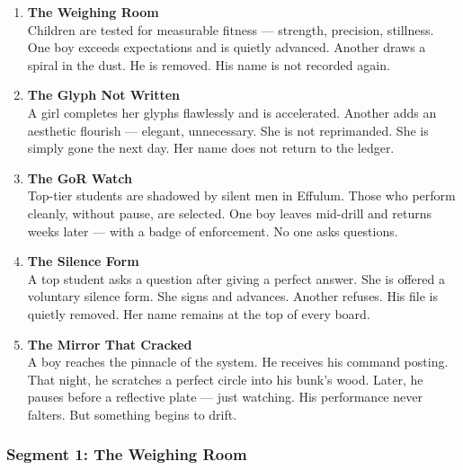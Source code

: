 \documentclass[9pt]{article}
\begin{document}
\begin{center}
\begin{enumerate}
    \item \textbf{The Weighing Room} \\
    Children are tested for measurable fitness — strength, precision, stillness. One boy exceeds expectations and is quietly advanced. Another draws a spiral in the dust. He is removed. His name is not recorded again.

    \vspace{.3in}
    \item \textbf{The Glyph Not Written} \\
    A girl completes her glyphs flawlessly and is accelerated. Another adds an aesthetic flourish — elegant, unnecessary. She is not reprimanded. She is simply gone the next day. Her name does not return to the ledger.

    \vspace{.3in}
    \item \textbf{The GoR Watch} \\
    Top-tier students are shadowed by silent men in Effulum. Those who perform cleanly, without pause, are selected. One boy leaves mid-drill and returns weeks later — with a badge of enforcement. No one asks questions.

    \vspace{.3in}
    \item \textbf{The Silence Form} \\
    A top student asks a question after giving a perfect answer. She is offered a voluntary silence form. She signs and advances. Another refuses. His file is quietly removed. Her name remains at the top of every board.

    \vspace{.3in}
    \item \textbf{The Mirror That Cracked} \\
    A boy reaches the pinnacle of the system. He receives his command posting. That night, he scratches a perfect circle into his bunk’s wood. Later, he pauses before a reflective plate — just watching. His performance never falters. But something begins to drift.
\end{enumerate}
\end{center}


\newpage

\subsubsection*{Segment 1: The Weighing Room}
\end{document}
